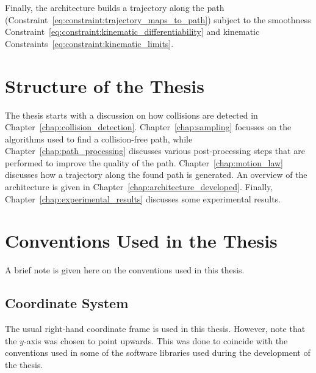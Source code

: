 		Finally, the architecture builds a trajectory along the path
		(Constraint~\ref{eq:constraint:trajectory_maps_to_path}) subject to the
		smoothness Constraint~\ref{eq:constraint:kinematic_differentiability}
		and kinematic Constraints~\ref{eq:constraint:kinematic_limits}.

	\section{Structure of the Thesis}

		The thesis starts with a discussion on how collisions are detected in
		Chapter~\ref{chap:collision_detection}. Chapter~\ref{chap:sampling}
		focusses on the algorithms used to find a collision-free path, while
		Chapter~\ref{chap:path_processing} discusses various post-processing
		steps that are performed to improve the quality of the path.
		Chapter~\ref{chap:motion_law} discusses how a trajectory along the found
		path is generated. An overview of the architecture is given in
		Chapter~\ref{chap:architecture_developed}. Finally,
		Chapter~\ref{chap:experimental_results} discusses some experimental
		results.

	\section{Conventions Used in the Thesis}

		A brief note is given here on the conventions used in this thesis.

		\subsection{Coordinate System}

			The usual right-hand coordinate frame is used in this thesis.
			However, note that the $y$-axis was chosen to point upwards. This
			was done to coincide with the conventions used in some of the
			software libraries used during the development of the thesis.
